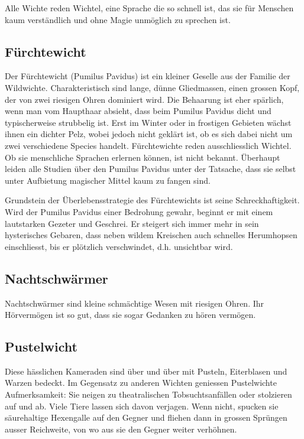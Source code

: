\documentclass[10pt,twoside,twocolumn,openany]{book}
\begin{document}
Alle Wichte reden Wichtel, eine Sprache die so schnell ist, das sie für Menschen kaum verständlich und ohne Magie unmöglich zu sprechen ist.



\subsection{Fürchtewicht}
Der Fürchtewicht (Pumilus Pavidus) ist ein kleiner Geselle aus der Familie der Wildwichte. Charakteristisch sind lange, dünne Gliedmassen, einen grossen Kopf, der von zwei riesigen Ohren dominiert wird. Die Behaarung ist eher spärlich, wenn man vom Haupthaar absieht, dass beim Pumilus Pavidus dicht und typischerweise strubbelig ist. Erst im Winter oder in frostigen Gebieten wächst ihnen ein dichter Pelz, wobei jedoch nicht geklärt ist, ob es sich dabei nicht um zwei verschiedene Species handelt.
Fürchtewichte reden ausschliesslich Wichtel. Ob sie menschliche Sprachen erlernen können, ist nicht bekannt. Überhaupt leiden alle Studien über den Pumilus Pavidus unter der Tatsache, dass sie selbst unter Aufbietung magischer Mittel kaum zu fangen sind.

Grundstein der Überlebensstrategie des Fürchtewichts ist seine Schreckhaftigkeit. Wird der Pumilus Pavidus einer Bedrohung gewahr, beginnt er mit einem lautstarken Gezeter und Geschrei. Er steigert sich immer mehr in sein hysterisches Gebaren, dass neben wildem Kreischen auch schnelles Herumhopsen einschliesst, bis er plötzlich verschwindet, d.h. unsichtbar wird.

\subsection{Nachtschwärmer}
Nachtschwärmer sind kleine schmächtige Wesen mit riesigen Ohren. Ihr Hörvermögen ist so gut, dass sie sogar Gedanken zu hören vermögen.

\subsection{Pustelwicht}
Diese hässlichen Kameraden sind über und über mit Pusteln, Eiterblasen und Warzen bedeckt. Im Gegensatz zu anderen Wichten geniessen Pustelwichte Aufmerksamkeit: Sie neigen zu theatralischen Tobsuchtsanfällen oder stolzieren auf und ab. Viele Tiere lassen sich davon verjagen. Wenn nicht, spucken sie säurehaltige Hexengalle auf den Gegner und fliehen dann in grossen Sprüngen ausser Reichweite, von wo aus sie den Gegner weiter verhöhnen.
\end{document}
